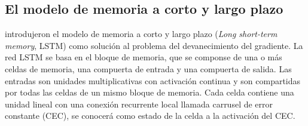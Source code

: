 

\subsection{El modelo de memoria a corto y largo plazo}
 introdujeron el modelo de memoria a corto y largo plazo ({\em Long short-term memory}, LSTM) como solución al problema del devanecimiento del gradiente. La red LSTM se basa en el bloque de memoria, que se componse de una o más celdas de memoria, una compuerta de entrada y una compuerta de salida. Las entradas son unidades multiplicativas con activación continua y son compartidas por todas las celdas de un mismo bloque de memoria. Cada celda contiene una unidad lineal con una conexión recurrente local llamada carrusel de error constante (CEC), se conocerá como estado de la celda a la activación del CEC.

